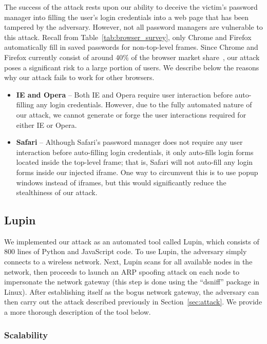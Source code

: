 \documentclass[letterpaper,twocolumn,10pt]{article}
\begin{document}
The success of the attack rests upon our ability to deceive the 
victim's password manager into filling the user's login credentials 
into a web page that has been tampered by the adversary. However, not 
all password managers are vulnerable to this attack. Recall from 
Table~\ref{tab:browser_survey}, only Chrome and Firefox automatically 
fill in saved passwords for non-top-level frames. Since Chrome and 
Firefox currently consist of around 40\% of the browser market 
share~\cite{marketshare}, our attack poses a significant risk to a 
large portion of users. We describe below the reasons why our attack 
fails to work for other browsers.

\begin{itemize}	
	\item \textbf{IE and Opera} -- Both IE and Opera require user 
interaction before auto-filling any login credentials. However, due to 
the fully automated nature of our attack, we cannot generate or forge 
the user interactions required for either IE or Opera.
	
	\item \textbf{Safari} -- Although Safari's password manager 
does not require any user interaction before auto-filling login 
credentials, it only auto-fills login forms located inside the top-level 
frame; that is, Safari will not auto-fill any login forms inside 
our injected iframe. One way to circumvent this is to use popup 
windows instead of iframes, but this would significantly reduce the 
stealthiness of our attack. 

\end{itemize}

\subsection{Lupin}
We implemented our attack as an automated tool called Lupin, which 
consists of 800 lines of Python and JavaScript code. To use Lupin, the 
adversary simply connects to a wireless network. Next, Lupin scans for 
all available nodes in the network, then proceeds to launch an ARP 
spoofing attack on each node to impersonate the network gateway (this 
step is done using the ``dsniff'' package in Linux). After 
establishing itself as the bogus network gateway, the adversary can 
then carry out the attack described previously in 
Section~\ref{sec:attack}. We provide a more thorough description of 
the tool below.

\subsubsection{Scalability}
\end{document}
